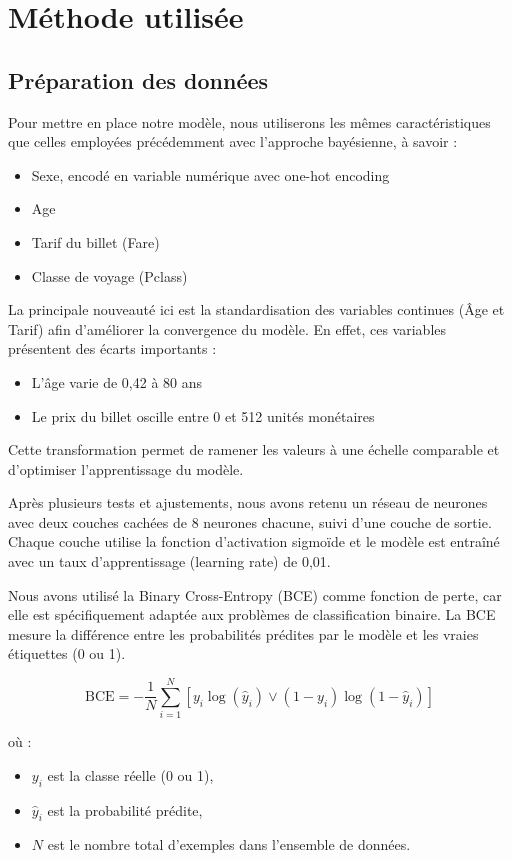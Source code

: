 \documentclass{rapportECL}
\begin{document}
\section{Méthode utilisée} 


\subsection{Préparation des données}

Pour mettre en place notre modèle, nous utiliserons les mêmes caractéristiques que celles employées précédemment avec l’approche bayésienne, à savoir :
\begin{itemize}
    \item Sexe, encodé en variable numérique avec one-hot encoding
    \item Age
    \item Tarif du billet (Fare)
    \item Classe de voyage (Pclass)
\end{itemize}

La principale nouveauté ici est la standardisation des variables continues (Âge et Tarif) afin d’améliorer la convergence du modèle. En effet, ces variables présentent des écarts importants :
\begin{itemize}
    \item L’âge varie de 0,42 à 80 ans
    \item Le prix du billet oscille entre 0 et 512 unités monétaires
\end{itemize}
Cette transformation permet de ramener les valeurs à une échelle comparable et d’optimiser l’apprentissage du modèle.

Après plusieurs tests et ajustements, nous avons retenu un réseau de neurones avec deux couches cachées de 8 neurones chacune, 
suivi d'une couche de sortie. 
Chaque couche utilise la fonction d’activation sigmoïde et le modèle est entraîné avec un taux d’apprentissage (learning rate) de 0,01.

Nous avons utilisé la Binary Cross-Entropy (BCE) comme fonction de perte, car elle est spécifiquement adaptée aux problèmes de classification binaire. 
La BCE mesure la différence entre les probabilités prédites par le modèle et les vraies étiquettes (0 ou 1).

\[
\text{BCE} = - \frac{1}{N} \sum_{i=1}^{N} \left[ y_i \log(\hat{y}_i) \vee (1 - y_i) \log(1 - \hat{y}_i) \right]
\]

où :
\begin{itemize}
    \item \( y_i \) est la classe réelle (0 ou 1),
    \item \( \hat{y}_i \) est la probabilité prédite,
    \item \( N \) est le nombre total d’exemples dans l’ensemble de données.
\end{itemize}
\end{document}
